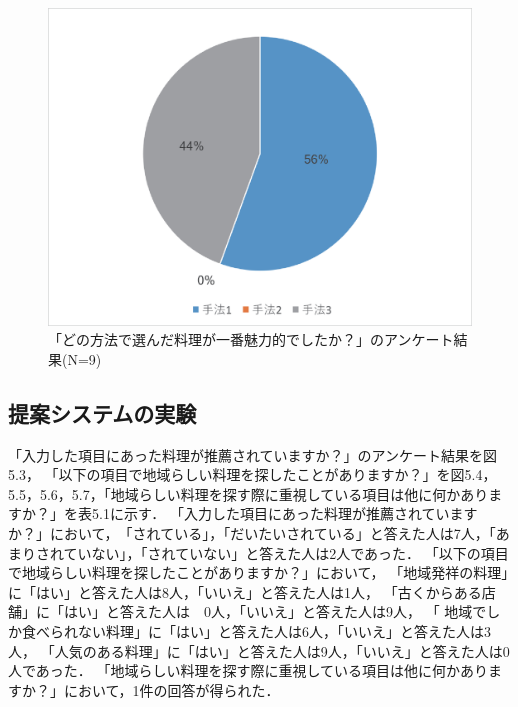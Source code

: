 \documentclass{funthesis}
\begin{document}
\begin{figure}[tbp]
  \begin{center}
    \includegraphics[clip,width=12cm]{5.2.eps}
    \caption[「どの方法で選んだ料理が一番魅力的でしたか？」のアンケート結果]{「どの方法で選んだ料理が一番魅力的でしたか？」のアンケート結果(N=9)}
  \end{center}
\end{figure}


\subsection{提案システムの実験}
「入力した項目にあった料理が推薦されていますか？」のアンケート結果を図5.3，
「以下の項目で地域らしい料理を探したことがありますか？」を図5.4，5.5，5.6，5.7，「地域らしい料理を探す際に重視している項目は他に何かありますか？」を表5.1に示す．
「入力した項目にあった料理が推薦されていますか？」において，　「されている」，「だいたいされている」と答えた人は7人，「あまりされていない」，「されていない」と答えた人は2人であった．
「以下の項目で地域らしい料理を探したことがありますか？」において，
「地域発祥の料理」に「はい」と答えた人は8人，「いいえ」と答えた人は1人，
「古くからある店舗」に「はい」と答えた人は　0人，「いいえ」と答えた人は9人，
「 地域でしか食べられない料理」に「はい」と答えた人は6人，「いいえ」と答えた人は3人，
「人気のある料理」に「はい」と答えた人は9人，「いいえ」と答えた人は0人であった．
「地域らしい料理を探す際に重視している項目は他に何かありますか？」において，1件の回答が得られた．
\end{document}
